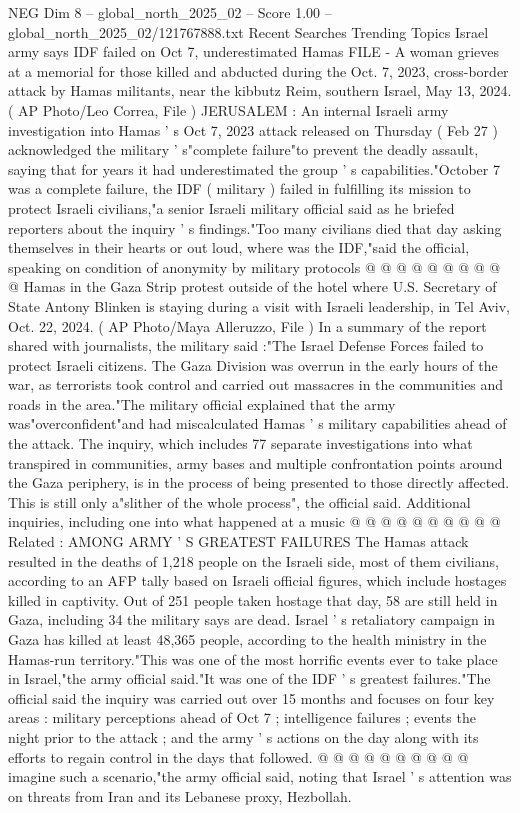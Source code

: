 \begin{textsample}{NEG Dim 8 – global\_north\_2025\_02 – Score 1.00 – global\_north\_2025\_02/121767888.txt}  \label{ex:f8_neg_436}
Recent Searches Trending Topics Israel army says IDF failed on Oct 7, underestimated Hamas FILE - A woman grieves at a memorial for those killed and abducted during the Oct. 7, 2023, cross-border attack by Hamas militants, near the kibbutz Reim, southern Israel, May 13, 2024. ( AP Photo/Leo Correa, File ) JERUSALEM : An internal Israeli army investigation into Hamas ' s Oct 7, 2023 attack released on Thursday ( Feb 27 ) acknowledged the military ' s"complete failure"to prevent the deadly assault, saying that for years it had underestimated the group ' s capabilities."October 7 was a complete failure, the IDF ( military ) failed in fulfilling its mission to protect Israeli civilians,"a senior Israeli military official said as he briefed reporters about the inquiry ' s findings."Too many civilians died that day asking themselves in their hearts or out loud, where was the IDF,"said the official, speaking on condition of anonymity by military protocols @ @ @ @ @ @ @ @ @ @ Hamas in the Gaza Strip protest outside of the hotel where U.S.
Secretary of State Antony Blinken is staying during a visit with Israeli leadership, in Tel Aviv, Oct. 22, 2024. ( AP Photo/Maya Alleruzzo, File ) In a summary of the report shared with journalists, the military said :"The Israel Defense Forces failed to protect Israeli citizens.
The Gaza Division was overrun in the early hours of the war, as terrorists took control and carried out massacres in the communities and roads in the area."The military official explained that the army was"overconfident"and had miscalculated Hamas ' s military capabilities ahead of the attack.
The inquiry, which includes 77 separate investigations into what transpired in communities, army bases and multiple confrontation points around the Gaza periphery, is in the process of being presented to those directly affected.
This is still only a"slither of the whole process", the official said.
Additional inquiries, including one into what happened at a music @ @ @ @ @ @ @ @ @ @ Related : AMONG ARMY ' S GREATEST FAILURES The Hamas attack resulted in the deaths of 1,218 people on the Israeli side, most of them civilians, according to an AFP tally based on Israeli official figures, which include hostages killed in captivity.
Out of 251 people taken hostage that day, 58 are still held in Gaza, including 34 the military says are dead.
Israel ' s retaliatory campaign in Gaza has killed at least 48,365 people, according to the health ministry in the Hamas-run territory."This was one of the most horrific events ever to take place in Israel,"the army official said."It was one of the IDF ' s greatest failures."The official said the inquiry was carried out over 15 months and focuses on four key areas : military perceptions ahead of Oct 7 ; intelligence failures ; events the night prior to the attack ; and the army ' s actions on the day along with its efforts to regain control in the days that followed. @ @ @ @ @ @ @ @ @ @ imagine such a scenario,"the army official said, noting that Israel ' s attention was on threats from Iran and its Lebanese proxy, Hezbollah.

\end{textsample}
